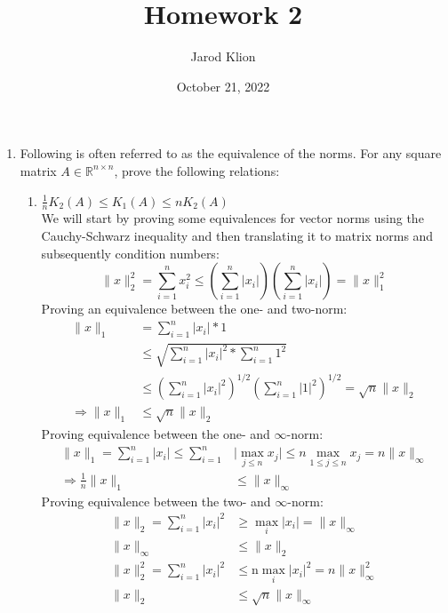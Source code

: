 \documentclass[10pt]{article}
\title{Homework 2}
\author{Jarod Klion}
\date{October 21, 2022}
\newcommand\norm[1]{\lVert#1\rVert}
\newcommand\abs[1]{\lvert#1\rvert}
\begin{document}
\maketitle



\begin{enumerate} 
\item Following is often referred to as the equivalence of the norms. For any square matrix $A \in \mathbb{R}^{n \times n}$, prove the following relations:
	\begin{enumerate}[label=(\alph*)]
		\item $\frac{1}{n}K_2(A) \leq K_1(A) \leq nK_2(A)$ \\ 
		\newline
		We will start by proving some equivalences for vector norms using the Cauchy-Schwarz inequality and then translating it to matrix norms and subsequently condition numbers:
		\begin{equation} \label{Cauchy}
			\norm{x}_2^2 = \sum_{i=1}^{n} x_{i}^2 \leq (\sum_{i=1}^{n}|x_i|)(\sum_{i=1}^{n}|x_i|) = \norm{x}_{1}^2
		\end{equation}
		Proving an equivalence between the one- and two-norm:
		\begin{align}
			\norm{x}_1 &=  \sum_{i=1}^{n} \abs{x_i} * 1 \nonumber \\
					&\leq \sqrt{\sum_{i=1}^{n} \abs{x_i}^2 * \sum_{i=1}^{n} 1^2} \nonumber \\ 
					&\leq \left(\sum_{i=1}^{n} \abs{x_i}^2\right)^{1/2} \left(\sum_{i=1}^{n} \abs{1}^2\right)^{1/2} = \sqrt{n}\norm{x}_2 \nonumber \\
			\label{vec2Norm}
			\Rightarrow \norm{x}_1 &\leq \sqrt{n} \norm{x}_2
		\end{align}
		Proving equivalence between the one- and $\infty$-norm:
		\begin{align}
			\norm{x}_1 = \sum_{i=1}^n \abs{x_i} \leq \sum_{i=1}^n &\abs{\max_{j \leq n} x_j} \leq n \max_{1\leq j \leq n} x_j = n \norm{x}_{\infty} \nonumber \\
			\label{vecInfNorm1}
			\Rightarrow \frac{1}{n} \norm{x}_1 &\leq \norm{x}_{\infty}
		\end{align}
		Proving equivalence between the two- and $\infty$-norm:
		\begin{align}
			\label{vecInfNorm2}
			\norm{x}_2 = \sum_{i=1}^n \abs{x_{i}}^2 &\geq \max_{i} \abs{x_i} = \norm{x}_\infty \nonumber \\
			\norm{x}_\infty &\leq \norm{x}_2 \\
			\norm{x}_2^2 = \sum_{i=1}^n \abs{x_{i}}^2 &\leq \mbox{n} \max_{i} \abs{x_i}^2 = n \norm{x}_\infty^2 \nonumber \\
			\label{vecInfNorm3}
			\norm{x}_2 &\leq \sqrt{n}\norm{x}_\infty
		\end{align}


\end{enumerate}
\end{enumerate}
\end{document}
